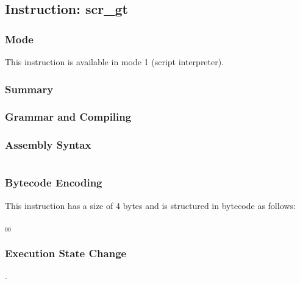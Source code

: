 \subsection{Instruction: scr\_gt}

\subsubsection{Mode}
This instruction is available in mode 1 (script interpreter).
\subsubsection{Summary}


\subsubsection{Grammar and Compiling}


\subsubsection{Assembly Syntax}

\begin{myquote}
\begin{verbatim}

\end{verbatim}
\end{myquote}

\subsubsection{Bytecode Encoding}

This instruction has a size of 4 bytes and is structured in bytecode as follows:

$_{00}$\ 

\subsubsection{Execution State Change}

.


